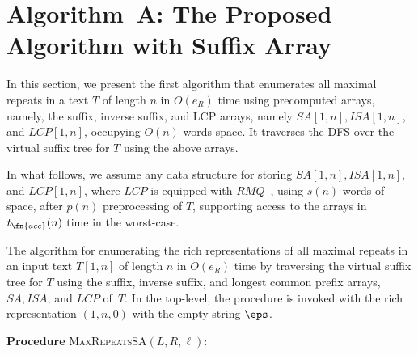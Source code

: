 

\section{Algorithm~A: The Proposed Algorithm with Suffix Array}
\label{sec:algo:forward}

In this section, we present the first algorithm that enumerates all maximal repeats in a text $T$ of length $n$ in $O(e_R)$ time
using precomputed arrays, namely, the suffix, inverse suffix, and LCP arrays, namely $SA[1,n], ISA[1,n]$, and $LCP[1,n]$, occupying $O(n)$ words space. It traverses the DFS over the virtual suffix tree for $T$ using the above arrays. 

In what follows, we assume any data structure for storing $SA[1,n], ISA[1,n]$, and $LCP[1,n]$, where $LCP$ is equipped with $RMQ$~\cite{bender:colton2000thelcaproblem}, using $s(n)$ words of space, after $p(n)$ preprocessing of $T$, supporting 
access to the arrays in $t_\fn{acc}(n)$ time in the worst-case. 


\begin{algorithm}[t]
  \caption{The algorithm for enumerating the rich representations of all maximal repeats in an input text $T[1,n]$ of length $n$ in $O(e_R)$ time by traversing the virtual suffix tree for $T$ using the suffix, inverse suffix, and longest common prefix arrays, $SA, ISA$, and $LCP$ of~$T$. In the top-level, the procedure is invoked with the rich representation $(1, n, 0)$ with the empty string $\eps$. 
  }\label{algo:maxrep:fwd}
  \textbf{Procedure} \textsc{MaxRepeatsSA}$(L, R, \ell)$:\\
\end{algorithm}

